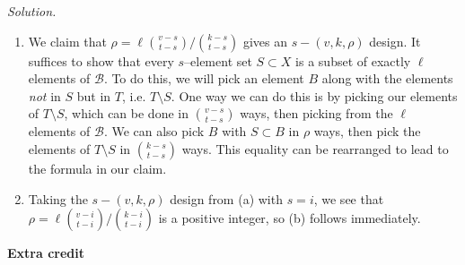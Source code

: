 \documentclass[11pt,letterpaper,dvipsnames]{article}
\newenvironment{solution}{\color{BlueViolet}\textit{Solution.}}{\color{black}}
\begin{document}
\begin{enumerate}
	\begin{solution}
		\begin{enumerate}
			\item We claim that $\rho=\ell \binom{v-s}{t-s} \big/ \binom{k-s}{t-s}$ gives an $s-(v,k,\rho)$ design. It suffices to show that every $s$--element set $S \subset X$ is a subset of exactly $\ell$ elements of $\mathcal{B}$. To do this, we will pick an element $B$ along with the elements \textit{not} in $S$ but in $T$, i.e. $T\setminus S$. One way we can do this is by picking our elements of $T\setminus S$, which can be done in $\binom{v-s}{t-s}$ ways, then picking from the $\ell$ elements of $\mathcal{B}$. We can also pick $B$ with $S \subset B$ in $\rho$ ways, then pick the elements of $T\setminus S$ in $\binom{k-s}{t-s}$ ways. This equality can be rearranged to lead to the formula in our claim.
			\item Taking the $s-(v,k,\rho)$ design from (a) with $s=i$, we see that $\rho=\ell \binom{v-i}{t-i} \big/ \binom{k-i}{t-i}$ is a positive integer, so (b) follows immediately.
		\end{enumerate}
	\end{solution}
	
	
	
\end{enumerate}

\textbf{Extra credit}
\end{document}
